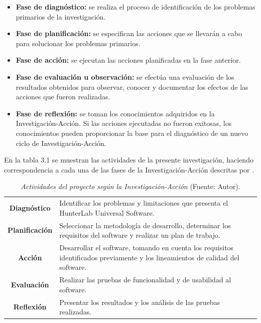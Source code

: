 	\begin{itemize}
		\item \textbf{Fase de diagn\'{o}stico:} se realiza el proceso de identificaci\'{o}n de los problemas primarios de la investigaci\'{o}n.
		\item \textbf{Fase de planificaci\'{o}n:} se especifican las acciones que se llevar\'{a}n a cabo para solucionar los problemas primarios.
		\item \textbf{Fase de acci\'{o}n:} se ejecutan las acciones planificadas en la fase anterior.
		\item \textbf{Fase de evaluaci\'{o}n u observaci\'{o}n:} se efect\'{u}a una evaluaci\'{o}n de los resultados obtenidos para observar, conocer y documentar los efectos de las acciones que fueron realizadas.
		\item \textbf{Fase de reflexi\'{o}n:} se toman los conocimientos adquiridos en la Investigaci\'{o}n-Acci\'{o}n. Si las acciones ejecutadas no fueron exitosas, los conocimientos pueden proporcionar la base para el diagn\'{o}stico de un nuevo ciclo de Investigaci\'{o}n-Acci\'{o}n.
	\end{itemize}

En la tabla 3.1 se muestran las actividades de la presente investigaci\'{o}n, haciendo correspondencia a cada una de las fases de la Investigaci\'{o}n-Acci\'{o}n descritas por .

	\begin{table}[t]
		\small
		\caption[Actividades del proyecto seg\'{u}n la Investigaci\'{o}n-Acci\'{o}n]{\textit{Actividades del proyecto seg\'{u}n la Investigaci\'{o}n-Acci\'{o}n} (Fuente: Autor).}
		\centering
		\setlength{\extrarowheight}{\altocelda}
		\begin{tabulary}{\anchotabla}{|c|J|}
			\hline
			 & \\ \hline
			\textbf{Diagn\'{o}stico} & Identificar los problemas y limitaciones que presenta el HunterLab Universal Software.\\ \hline
			\textbf{Planificaci\'{o}n} & Seleccionar la metodolog\'{i}a de desarrollo, determinar los requisitos del software y realizar un plan de trabajo.
\\ \hline
			\textbf{Acci\'{o}n} & Desarrollar el software, tomando en cuenta los requisitos identificados previamente y los lineamientos de calidad del software.\\ \hline
			\textbf{Evaluaci\'{o}n} & Realizar las pruebas de funcionalidad y de usabilidad al software.\\ \hline
			\textbf{Reflexi\'{o}n} & Presentar los resultados y los an\'{a}lisis de las pruebas realizadas.\\ \hline
		\end{tabulary}
	\end{table}


